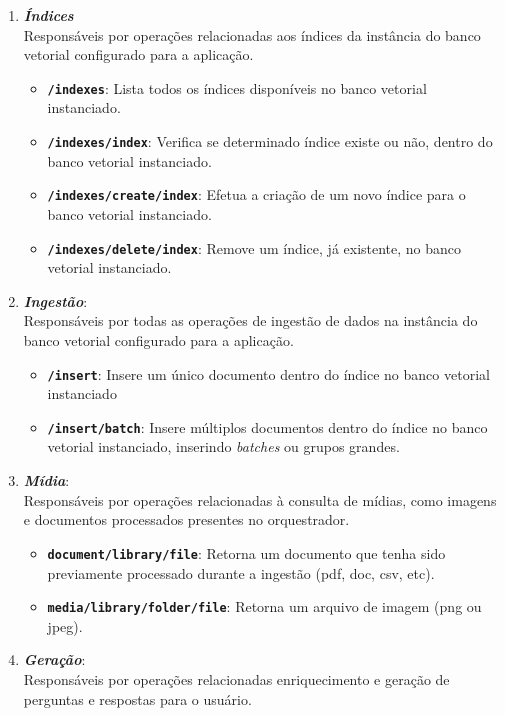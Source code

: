 \documentclass[a4paper, 12pt]{article}
\begin{document}
    \begin{enumerate}
        \item \textbf{\textit{Índices}}\\
        Responsáveis por operações relacionadas aos índices da instância do banco vetorial configurado para a aplicação.
        \begin{itemize}
            \item \textbf{\texttt{/indexes}}: Lista todos os índices disponíveis no banco vetorial instanciado.
            \item \textbf{\texttt{/indexes/index}}: Verifica se determinado índice existe ou não, dentro do banco vetorial instanciado.
            \item \textbf{\texttt{/indexes/create/index}}: Efetua a criação de um novo índice para o banco vetorial instanciado.
            \item \textbf{\texttt{/indexes/delete/index}}: Remove um índice, já existente, no banco vetorial instanciado.
        \end{itemize}
        \item \textbf{\textit{Ingestão}}:\\ Responsáveis por todas as operações de ingestão de dados na instância do banco vetorial configurado para a aplicação.
        \begin{itemize}
            \item \textbf{\texttt{/insert}}: Insere um único documento dentro do índice no banco vetorial instanciado
            \item \textbf{\texttt{/insert/batch}}: Insere múltiplos documentos dentro do índice no banco vetorial instanciado, inserindo \textit{batches} ou grupos grandes.
        \end{itemize}
        \item \textbf{\textit{Mídia}}:\\ Responsáveis por operações relacionadas à consulta de mídias, como imagens e documentos processados presentes no orquestrador.
        \begin{itemize}
            \item \textbf{\texttt{document/library/file}}: Retorna um documento que tenha sido previamente processado durante a ingestão (pdf, doc, csv, etc).
            \item \textbf{\texttt{media/library/folder/file}}: Retorna um arquivo de imagem (png ou jpeg).
        \end{itemize}
        \item \textbf{\textit{Geração}}:\\ Responsáveis por operações relacionadas enriquecimento e geração de perguntas e respostas para o usuário.

\end{enumerate}
\end{document}
